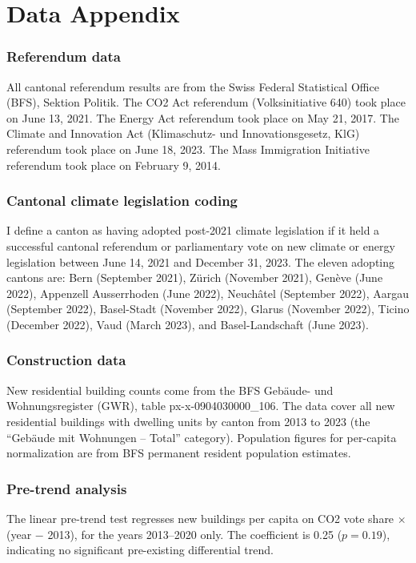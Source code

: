 \documentclass[12pt]{article}
\begin{document}
\newpage
\appendix

\section{Data Appendix}
\label{sec:data_appendix}

\subsubsection*{Referendum data} All cantonal referendum results are from the Swiss Federal Statistical Office (BFS), Sektion Politik. The CO2 Act referendum (Volksinitiative 640) took place on June 13, 2021. The Energy Act referendum took place on May 21, 2017. The Climate and Innovation Act (Klimaschutz- und Innovationsgesetz, KlG) referendum took place on June 18, 2023. The Mass Immigration Initiative referendum took place on February 9, 2014.

\subsubsection*{Cantonal climate legislation coding} I define a canton as having adopted post-2021 climate legislation if it held a successful cantonal referendum or parliamentary vote on new climate or energy legislation between June 14, 2021 and December 31, 2023. The eleven adopting cantons are: Bern (September 2021), Z\"urich (November 2021), Gen\`eve (June 2022), Appenzell Ausserrhoden (June 2022), Neuch\^atel (September 2022), Aargau (September 2022), Basel-Stadt (November 2022), Glarus (November 2022), Ticino (December 2022), Vaud (March 2023), and Basel-Landschaft (June 2023).

\subsubsection*{Construction data} New residential building counts come from the BFS Geb\"aude- und Wohnungsregister (GWR), table px-x-0904030000\_106. The data cover all new residential buildings with dwelling units by canton from 2013 to 2023 (the ``Geb\"aude mit Wohnungen -- Total'' category). Population figures for per-capita normalization are from BFS permanent resident population estimates.

\subsubsection*{Pre-trend analysis} The linear pre-trend test regresses new buildings per capita on CO2 vote share $\times$ (year $-$ 2013), for the years 2013--2020 only. The coefficient is 0.25 ($p = 0.19$), indicating no significant pre-existing differential trend.
\end{document}
